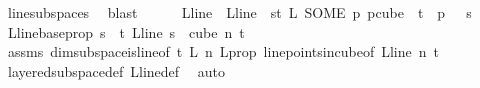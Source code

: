 \begin{isabellebody}
\ line{\isacharunderscore}{\kern0pt}subspace{\isacharunderscore}{\kern0pt}s\ \isamarkupfalse%
\ blast\isanewline
\ \ \ \ \isamarkupfalse%
\ L{\isacharunderscore}{\kern0pt}line\ \ {\isachardoublequoteopen}L{\isacharunderscore}{\kern0pt}line\ {\isasymequiv}\ {\isacharparenleft}{\kern0pt}{\isasymlambda}s{\isasymin}{\isacharbraceleft}{\kern0pt}{\isachardot}{\kern0pt}{\isachardot}{\kern0pt}{\isacharless}{\kern0pt}t{\isacharplus}{\kern0pt}{}{\isacharbraceright}{\kern0pt}{\isachardot}{\kern0pt}\ L\ {\isacharparenleft}{\kern0pt}SOME\ p{\isachardot}{\kern0pt}\ p{\isasymin}cube\ {}\ {\isacharparenleft}{\kern0pt}t{\isacharplus}{\kern0pt}{}{\isacharparenright}{\kern0pt}\ {\isasymand}\ p\ {}\ {\isacharequal}{\kern0pt}\ s{\isacharparenright}{\kern0pt}{\isacharparenright}{\kern0pt}{\isachardoublequoteclose}\isanewline
\ \ \ \ \isamarkupfalse%
\ L{\isacharunderscore}{\kern0pt}line{\isacharunderscore}{\kern0pt}base{\isacharunderscore}{\kern0pt}prop{\isacharcolon}{\kern0pt}\ {\isachardoublequoteopen}{\isasymforall}s\ {\isasymin}\ {\isacharbraceleft}{\kern0pt}{\isachardot}{\kern0pt}{\isachardot}{\kern0pt}{\isacharless}{\kern0pt}t{\isacharplus}{\kern0pt}{}{\isacharbraceright}{\kern0pt}{\isachardot}{\kern0pt}\ L{\isacharunderscore}{\kern0pt}line\ s\ {\isasymin}\ cube\ n\ {\isacharparenleft}{\kern0pt}t{\isacharplus}{\kern0pt}{}{\isacharparenright}{\kern0pt}{\isachardoublequoteclose}\ \isamarkupfalse%
\ assms{\isacharparenleft}{\kern0pt}{}{\isacharparenright}{\kern0pt}\ dim{}{\isacharunderscore}{\kern0pt}subspace{\isacharunderscore}{\kern0pt}is{\isacharunderscore}{\kern0pt}line{\isacharbrackleft}{\kern0pt}of\ {\isachardoublequoteopen}t{\isacharplus}{\kern0pt}{}{\isachardoublequoteclose}\ {\isachardoublequoteopen}L{\isachardoublequoteclose}\ {\isachardoublequoteopen}n{\isachardoublequoteclose}{\isacharbrackright}{\kern0pt}\ L{\isacharunderscore}{\kern0pt}prop\ line{\isacharunderscore}{\kern0pt}points{\isacharunderscore}{\kern0pt}in{\isacharunderscore}{\kern0pt}cube{\isacharbrackleft}{\kern0pt}of\ L{\isacharunderscore}{\kern0pt}line\ n\ {\isachardoublequoteopen}t{\isacharplus}{\kern0pt}{}{\isachardoublequoteclose}{\isacharbrackright}{\kern0pt}\ \isamarkupfalse%
\ layered{\isacharunderscore}{\kern0pt}subspace{\isacharunderscore}{\kern0pt}def\ L{\isacharunderscore}{\kern0pt}line{\isacharunderscore}{\kern0pt}def\ \isamarkupfalse%
\ auto%
\begin{isamarkuptext}%

\end{isamarkuptext}
\end{isabellebody}

